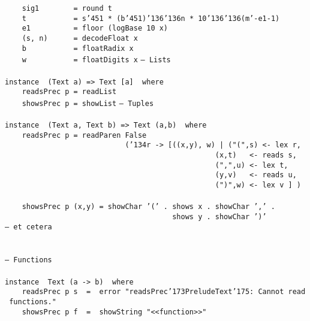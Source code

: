 \mbox{\tt \ \ \ \ sig1\ \ \ \ \ \ \ \ =\ round\ t}\\
\mbox{\tt \ \ \ \ t\ \ \ \ \ \ \ \ \ \ \ =\ s{\char'45}1\ *\ (b{\char'45}1){\char'136}{\char'136}n\ *\ 10{\char'136}{\char'136}(m'-e1-1)}\\
\mbox{\tt \ \ \ \ e1\ \ \ \ \ \ \ \ \ \ =\ floor\ (logBase\ 10\ x)}\\
\mbox{\tt \ \ \ \ (s,\ n)\ \ \ \ \ \ =\ decodeFloat\ x}\\
\mbox{\tt \ \ \ \ b\ \ \ \ \ \ \ \ \ \ \ =\ floatRadix\ x}\\
\mbox{\tt \ \ \ \ w\ \ \ \ \ \ \ \ \ \ \ =\ floatDigits\ x}
\eprogB\noindent\bprogB
\mbox{\tt --\ Lists}\\
\mbox{\tt }\\[-8pt]
\mbox{\tt instance\ \ (Text\ a)\ =>\ Text\ [a]\ \ where}\\
\mbox{\tt \ \ \ \ readsPrec\ p\ =\ readList}\\
\mbox{\tt \ \ \ \ showsPrec\ p\ =\ showList}
\eprogB\noindent\bprogB
\mbox{\tt --\ Tuples}\\
\mbox{\tt }\\[-8pt]
\mbox{\tt instance\ \ (Text\ a,\ Text\ b)\ =>\ Text\ (a,b)\ \ where}\\
\mbox{\tt \ \ \ \ readsPrec\ p\ =\ readParen\ False}\\
\mbox{\tt \ \ \ \ \ \ \ \ \ \ \ \ \ \ \ \ \ \ \ \ \ \ \ \ \ \ \ \ ({\char'134}r\ ->\ [((x,y),\ w)\ |\ ("(",s)\ <-\ lex\ r,}\\
\mbox{\tt \ \ \ \ \ \ \ \ \ \ \ \ \ \ \ \ \ \ \ \ \ \ \ \ \ \ \ \ \ \ \ \ \ \ \ \ \ \ \ \ \ \ \ \ \ \ \ \ \ (x,t)\ \ \ <-\ reads\ s,}\\
\mbox{\tt \ \ \ \ \ \ \ \ \ \ \ \ \ \ \ \ \ \ \ \ \ \ \ \ \ \ \ \ \ \ \ \ \ \ \ \ \ \ \ \ \ \ \ \ \ \ \ \ \ (",",u)\ <-\ lex\ t,}\\
\mbox{\tt \ \ \ \ \ \ \ \ \ \ \ \ \ \ \ \ \ \ \ \ \ \ \ \ \ \ \ \ \ \ \ \ \ \ \ \ \ \ \ \ \ \ \ \ \ \ \ \ \ (y,v)\ \ \ <-\ reads\ u,}\\
\mbox{\tt \ \ \ \ \ \ \ \ \ \ \ \ \ \ \ \ \ \ \ \ \ \ \ \ \ \ \ \ \ \ \ \ \ \ \ \ \ \ \ \ \ \ \ \ \ \ \ \ \ (")",w)\ <-\ lex\ v\ ]\ )}\\
\mbox{\tt }\\[-8pt]
\mbox{\tt \ \ \ \ showsPrec\ p\ (x,y)\ =\ showChar\ '('\ .\ shows\ x\ .\ showChar\ ','\ .}\\
\mbox{\tt \ \ \ \ \ \ \ \ \ \ \ \ \ \ \ \ \ \ \ \ \ \ \ \ \ \ \ \ \ \ \ \ \ \ \ \ \ \ \ shows\ y\ .\ showChar\ ')'}\\
\mbox{\tt --\ et\ cetera}\\
\mbox{\tt }\\[-8pt]
\mbox{\tt }\\[-8pt]
\mbox{\tt --\ Functions}\\
\mbox{\tt }\\[-8pt]
\mbox{\tt instance\ \ Text\ (a\ ->\ b)\ \ where}\\
\mbox{\tt \ \ \ \ readsPrec\ p\ s\ \ =\ \ error\ "readsPrec{\char'173}PreludeText{\char'175}:\ Cannot\ read\ functions."}\\
\mbox{\tt \ \ \ \ showsPrec\ p\ f\ \ =\ \ showString\ "<<function>>"}
\eprogB
